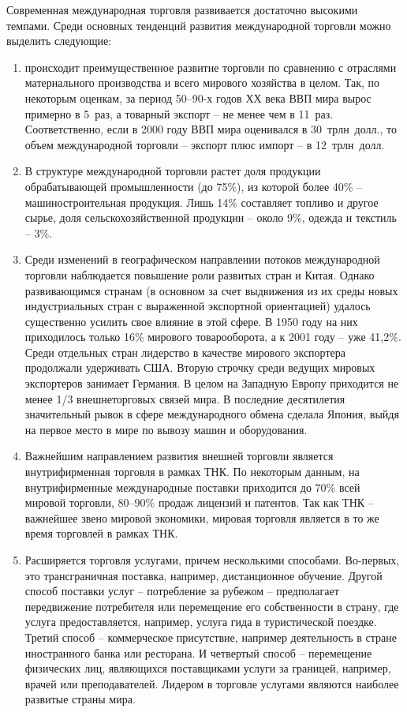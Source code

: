 Современная международная торговля развивается достаточно высокими темпами.
Среди основных тенденций развития международной торговли можно выделить
следующие:
\begin{enumerate}
    \item происходит преимущественное развитие торговли по сравнению с
    отраслями материального производства и всего мирового хозяйства в целом.
    Так, по некоторым оценкам, за период 50--90-х годов ХХ века ВВП мира вырос
    примерно в 5~раз, а товарный экспорт -- не менее чем в 11~раз.
    Соответственно, если в 2000 году ВВП мира оценивался в 30~трлн~долл., то
    объем международной торговли -- экспорт плюс импорт -- в 12~трлн~долл.
    \item В структуре международной торговли растет доля продукции
    обрабатывающей промышленности (до 75\%), из которой более 40\% --
    машиностроительная продукция. Лишь 14\% составляет топливо и другое сырье,
    доля сельскохозяйственной продукции -- около 9\%, одежда и текстиль -- 3\%.
    \item Среди изменений в географическом направлении потоков международной
    торговли наблюдается повышение роли развитых стран и Китая. Однако
    развивающимся странам (в основном за счет выдвижения из их среды новых
    индустриальных стран с выраженной экспортной ориентацией) удалось
    существенно усилить свое влияние в этой сфере. В 1950 году на них
    приходилось только 16\% мирового товарооборота, а к 2001 году -- уже
    41,2\%. Среди отдельных стран лидерство в качестве мирового экспортера
    продолжали удерживать США. Вторую строчку среди ведущих мировых экспортеров
    занимает Германия. В целом на Западную Европу приходится не менее 1/3
    внешнеторговых связей мира. В последние десятилетия значительный рывок в
    сфере международного обмена сделала Япония, выйдя на первое место в мире по
    вывозу машин и оборудования.
    \item Важнейшим направлением развития внешней торговли является
    внутрифирменная торговля в рамках ТНК. По некоторым данным, на
    внутрифирменные международные поставки приходится до 70\% всей мировой
    торговли, 80--90\% продаж лицензий и патентов. Так как ТНК -- важнейшее
    звено мировой экономики, мировая торговля является в то же время торговлей
    в рамках ТНК.
    \item Расширяется торговля услугами, причем несколькими способами.
    Во-первых, это трансграничная поставка, например, дистанционное обучение.
    Другой способ поставки услуг -- потребление за рубежом -- предполагает
    передвижение потребителя или перемещение его собственности в страну, где
    услуга предоставляется, например, услуга гида в туристической поездке.
    Третий способ -- коммерческое присутствие, например деятельность в стране
    иностранного банка или ресторана. И четвертый способ -- перемещение
    физических лиц, являющихся поставщиками услуги за границей, например,
    врачей или преподавателей. Лидером в торговле услугами являются наиболее
    развитые страны мира.
\end{enumerate}

